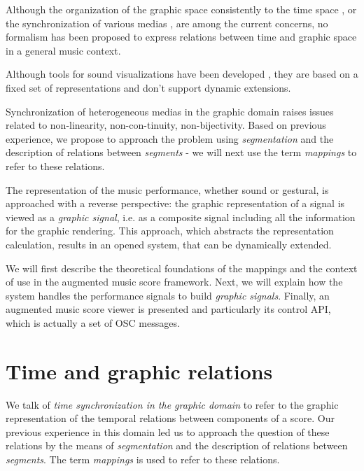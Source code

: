 \documentclass{article}
\begin{document}
Although the organization of the graphic space consistently to the time space \cite{bresson08}, or the synchronization of various medias \cite{baggi09b}, are among the current concerns, no formalism has been proposed to express relations between time and graphic space in a general music context.

Although tools for sound visualizations have been developed \cite{sonic06, ACOUSM04}, they are based on a fixed set of representations and don't support dynamic extensions. 

Synchronization of heterogeneous medias in the graphic domain raises issues related to non-linearity, non-con-tinuity, non-bijectivity. Based on previous experience, we propose to approach the problem using \emph{segmentation} and the description of relations between \emph{segments} - we will next use the term \emph{mappings} to refer to these relations.

The representation of the music performance, whether sound or gestural, is approached with a reverse perspective: the graphic representation of a signal is viewed as a \emph{graphic signal}, i.e. as a composite signal including all the information for the graphic rendering. This approach, which abstracts the representation calculation, results in an opened system, that can be dynamically extended.

We will first describe the theoretical foundations of the mappings and the context of use in the augmented music score framework. Next, we will explain how the system handles the performance signals to build \emph{graphic signals}. Finally, an augmented music score viewer is presented and particularly its control API, which is actually a set of OSC messages\cite{wright02}.


\section{Time and graphic relations}
We talk of \emph{time synchronization in the graphic domain} to refer to the graphic representation of the temporal relations between components of a score. Our previous experience in this domain \cite{Fober:04c,Fober:07b} led us to approach the question of these relations by the means of \emph{segmentation} and the description of relations between \emph{segments}. The term \emph{mappings} is used to refer to these relations.
\end{document}
